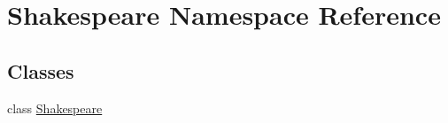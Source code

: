 \hypertarget{namespace_shakespeare}{}\section{Shakespeare Namespace Reference}
\label{namespace_shakespeare}
\subsection*{Classes}
\begin{DoxyCompactItemize}
\item 
class \hyperlink{class_shakespeare_1_1_shakespeare}{Shakespeare}
\end{DoxyCompactItemize}
